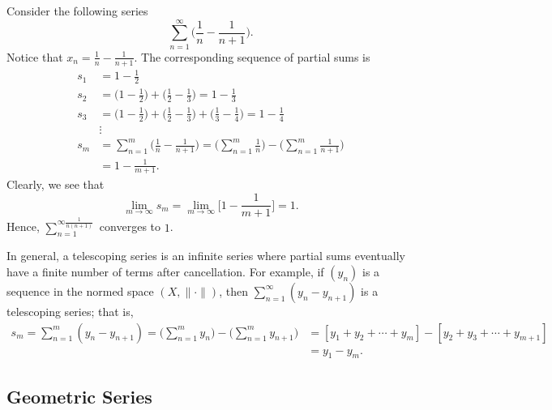 \documentclass[a4paper]{article}
\begin{document}
\begin{eg}
   Consider the following series 
   \[  \sum_{ n=1  }^{ \infty  } \Big(  \frac{ 1 }{ n } - \frac{ 1 }{ n + 1 }  \Big). \]
   Notice that \( {x}_{n} = \frac{ 1 }{ n }  - \frac{ 1 }{ n+1 }  \). The corresponding sequence of partial sums is  
   \begin{align*}
       {s}_{1} &= 1 - \frac{ 1 }{ 2 }  \\
       {s}_{2} &= \Big(  1 - \frac{ 1 }{ 2 }  \Big) + \Big(  \frac{ 1 }{ 2 }  - \frac{ 1 }{ 3 }  \Big) = 1 - \frac{ 1 }{ 3 } \\
       {s}_{3} &= \Big(  1 - \frac{ 1 }{ 2 }  \Big) + \Big(  \frac{ 1 }{ 2 }  - \frac{ 1 }{ 3 }  \Big) + \Big(  \frac{ 1 }{ 3 }  - \frac{ 1 }{ 4 }  \Big) = 1 - \frac{ 1 }{ 4 } \\
               &\vdots \\
       {s}_{m} &= \sum_{ n=1  }^{ m } \Big(  \frac{ 1 }{ n }  - \frac{ 1 }{ n + 1 }  \Big) = \Big(  \sum_{ n=1  }^{ m  } \frac{ 1 }{ n }  \Big) - \Big(  \sum_{ n=1  }^{ m } \frac{ 1 }{ n+1 }  \Big) \\ 
               &= 1 - \frac{ 1 }{ m + 1 }.
   \end{align*}
   Clearly, we see that 
   \[  \lim_{ m \to \infty  }  {s}_{m} = \lim_{ m \to \infty  }  \Big[ 1 - \frac{ 1 }{  m + 1  } \Big] = 1.  \]
   Hence, \( \sum_{ n=1  }^{ \infty   \frac{ 1 }{ n (n+1) }  } \) converges to \( 1  \).
\end{eg}

In general, a telescoping series is an infinite series where partial sums eventually have a finite number of terms after cancellation. For example, if \( ({y}_{n}) \) is a sequence in the normed space \( (X, \|\cdot\|) \), then \( \sum_{ n=1  }^{ \infty   } ({y}_{n} - {y}_{n+1}) \) is a telescoping series; that is, 
\begin{align*}
    {s}_{m} = \sum_{ n=1  }^{ m } ({y}_{n} - {y}_{n+1}) = \Big(  \sum_{ n=1  }^{ m } {y}_{n} \Big) - \Big(  \sum_{ n=1  }^{ m } {y}_{n+1} \Big) &= [{y}_{1} + {y}_{2} + \cdots + {y}_{m}] - [{y}_{2} + {y}_{3} + \cdots + {y}_{m+1}] \\
                                                                                                                                                &= {y}_{1} - {y}_{m}.
\end{align*}

\subsection{Geometric Series}
\end{document}
